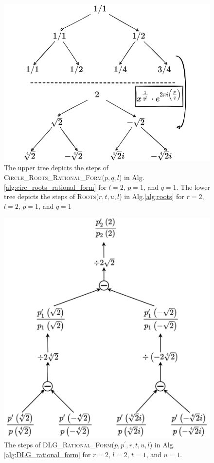 \documentclass[sigconf]{acmart}
\begin{document}
\begin{figure}[h]
  \centering
  \includegraphics[width=\linewidth]{rational_root_tree.png}
  \caption{The upper tree depicts the steps of \textsc{\textsc{Circle\_Roots\_Rational\_Form}}($p,q,l$) in Alg.\ref{alg:circ_roots_rational_form} for $l=2$, $p=1$, and $q=1$. The lower tree depicts the steps of \textsc{Roots}($r,t,u,l$) in Alg.\ref{alg:roots} for $r=2$, $l=2$, $p=1$, and $q=1$}\label{fig:rat_roots_tree}
  \Description{}
\end{figure}

\begin{figure}[h]
  \centering
  \includegraphics[width=\linewidth]{p_prime.png}
  \caption{The steps of \textsc{DLG\_Rational\_Form}($p,p^\prime,r,t,u,l$) in Alg.\ref{alg:DLG_rational_form} for $r=2$, $l=2$, $t=1$, and $u=1$.}\label{fig:DLG}
  \Description{}
\end{figure}
\end{document}
